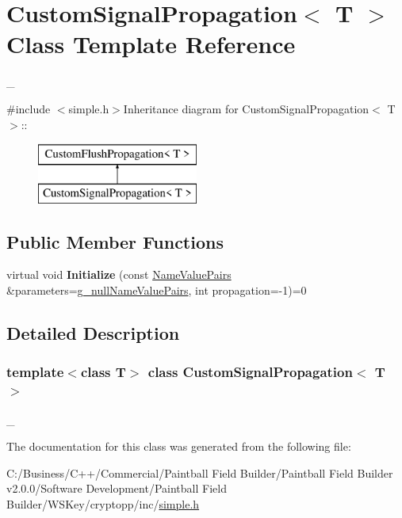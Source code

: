 \hypertarget{class_custom_signal_propagation}{
\section{CustomSignalPropagation$<$ T $>$ Class Template Reference}
\label{class_custom_signal_propagation}
}


\_\-  


{\ttfamily \#include $<$simple.h$>$}Inheritance diagram for CustomSignalPropagation$<$ T $>$::\begin{figure}[H]
\begin{center}
\leavevmode
\includegraphics[height=2cm]{class_custom_signal_propagation}
\end{center}
\end{figure}
\subsection*{Public Member Functions}
\begin{DoxyCompactItemize}
\item 
\hypertarget{class_custom_signal_propagation_a74fd5f3bb893d25f73f5bbab2c2d89ef}{
virtual void {\bfseries Initialize} (const \hyperlink{class_name_value_pairs}{NameValuePairs} \&parameters=\hyperlink{cryptlib_8h_ab1b0f7d11a21c6163be8ca2662ce2ac6}{g\_\-nullNameValuePairs}, int propagation=-\/1)=0}
\label{class_custom_signal_propagation_a74fd5f3bb893d25f73f5bbab2c2d89ef}

\end{DoxyCompactItemize}


\subsection{Detailed Description}
\subsubsection*{template$<$class T$>$ class CustomSignalPropagation$<$ T $>$}

\_\- 

The documentation for this class was generated from the following file:\begin{DoxyCompactItemize}
\item 
C:/Business/C++/Commercial/Paintball Field Builder/Paintball Field Builder v2.0.0/Software Development/Paintball Field Builder/WSKey/cryptopp/inc/\hyperlink{simple_8h}{simple.h}\end{DoxyCompactItemize}

